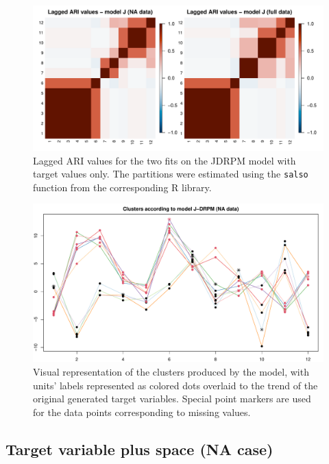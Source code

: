 \documentclass[12pt,	%
	a4paper,		%
	twoside,		%
	openright,		%
	titlepage,%
	]{book}
\theoremstyle{definition}
\newcommand{\mjline}[1]{\texttt{#1}}
\begin{document}
\begin{figure}[!ht]
    \centering
    \includegraphics[width=1\linewidth]{Testing/NA data/no space NA/ari.pdf}
    \caption[Lagged ARI values of JDRPM fits, target values only, full vs NA dataset]{Lagged ARI values for the two fits on the JDRPM model with target values only. The partitions were estimated using the \mjline{salso} function from the corresponding R library.}
    \label{fig:ari no space NA}
\end{figure}


\begin{figure}[!ht]
    \centering
    \includegraphics[width=1\linewidth]{Testing/NA data/no space NA/clusters_J.pdf}
    \caption[Visual representation of the clusters of JDRPM fit, target values only, NA dataset]{Visual representation of the clusters produced by the model, with units' labels represented as colored dots overlaid to the trend of the original generated target variables. Special point markers are used for the data points corresponding to missing values.}
    \label{fig:clusters no space NA}
\end{figure}


\subsection{Target variable plus space (NA case)}
\end{document}
